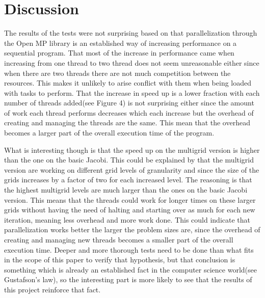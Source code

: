 \documentclass{article}
\begin{document}
\section{Discussion}\label{discussion}



The results of the tests were not surprising based on that parallelization through the Open MP library is an established way of increasing performance on a sequential program. That most of the increase in performance came when increasing from one thread to two thread does not seem unreasonable either since when there are two threads there are not much competition between the resources. This makes it unlikely to arise conflict with them when being loaded with tasks to perform. That the increase in speed up is a lower fraction with each number of threads added(see Figure 4) is not surprising either since the amount of work each thread performs decreases which each increase but the overhead of creating and managing the threads are the same. This mean that the overhead becomes a larger part of the overall execution time of the program. 

What is interesting though is that the speed up on the multigrid version is higher than the one on the basic Jacobi. This could be explained by that the multigrid version are working on different grid levels of granularity and since the size of the grids increases by a factor of two for each increased level. The reasoning is that the highest multigrid levels are much larger than the ones on the basic Jacobi version. This means that the threads could work for longer times on these larger grids without having the need of halting and starting over as much for each new iteration, meaning less overhead and more work done. This could indicate that parallelization works better the larger the problem sizes are, since the overhead of creating and managing new threads becomes a smaller part of the overall execution time. Deeper and more thorough tests need to be done than what fits in the scope of this paper to verify that hypothesis, but that conclusion is something which is already an established fact in the computer science world(see Gustafson’s law), so the interesting part is more likely to see that the results of this project reinforce that fact. 
\end{document}
